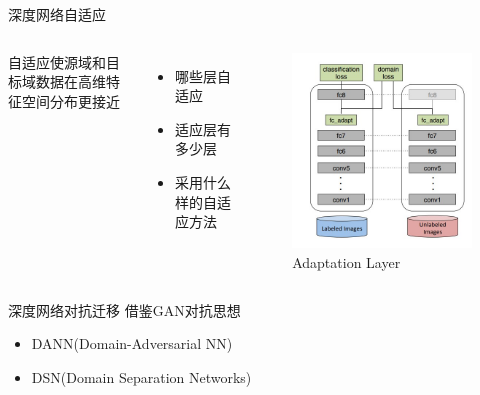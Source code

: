 \begin{frame}{深度网络自适应}

    \begin{columns}

        自适应使源域和目标域数据在高维特征空间分布更接近
        \begin{itemize}
            \item 哪些层自适应
            \item 适应层有多少层
            \item 采用什么样的自适应方法
        \end{itemize}
        
        \begin{figure}
            \centering
            \includegraphics[height=0.7\textheight]{pic/pic0202.jpg}
            \caption{Adaptation Layer}
            \label{fig:07}
        \end{figure}

    \end{columns}
\end{frame}

\begin{frame}{深度网络对抗迁移}
    借鉴GAN对抗思想
    \begin{itemize}
        \item DANN(Domain-Adversarial NN)
        \item DSN(Domain Separation Networks)
    \end{itemize}
\end{frame}

